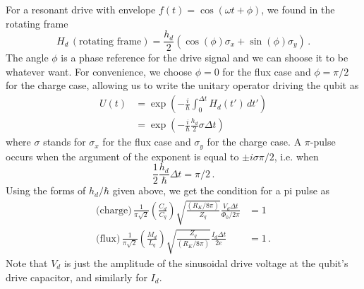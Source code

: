 For a resonant drive with envelope $f(t) = \cos(\omega t + \phi)$, we found in the rotating frame
\begin{equation*}
  H_d \, (\text{rotating frame}) = \frac{h_d}{2} \left( \cos(\phi) \sigma_x + \sin(\phi) \sigma_y \right) \, .
\end{equation*}
The angle $\phi$ is a phase reference for the drive signal and we can shoose it to be whatever want.
For convenience, we choose $\phi=0$ for the flux case and $\phi=\pi/2$ for the charge case, allowing us to write the unitary operator driving the qubit as
\begin{align*}
  U(t)
  &= \exp \left( -\frac{i}{\hbar} \int_0^{\Delta t} H_d(t') \, dt' \right) \\
  &= \exp \left( -\frac{i}{\hbar} \frac{h_d}{2} \sigma \Delta t \right)
\end{align*}
where $\sigma$ stands for $\sigma_x$ for the flux case and $\sigma_y$ for the charge case.
A $\pi$-pulse occurs when the argument of the exponent is equal to $\pm i \sigma \pi / 2$, i.e. when
\begin{equation*}
  \frac{1}{2} \frac{h_d}{\hbar} \Delta t = \pi / 2 \, .
\end{equation*}
Using the forms of $h_d/\hbar$ given above, we get the condition for a pi pulse as
\begin{align*}
  \text{(charge)} \, \frac{1}{\pi\sqrt{2}} \left( \frac{C_d}{C_q} \right) \sqrt{\frac{(R_K/8\pi)}{Z_q}} \frac{V_d \Delta t}{\Phi_0/2\pi} &= 1 \\
  \text{(flux)} \, \frac{1}{\pi\sqrt{2}} \left( \frac{M_d}{L_q} \right) \sqrt{\frac{Z_q}{(R_K/8\pi)}} \frac{I_d \Delta t}{2e} &= 1 \, .
\end{align*}
Note that $V_d$ is just the amplitude of the sinusoidal drive voltage at the qubit's drive capacitor, and similarly for $I_d$.


